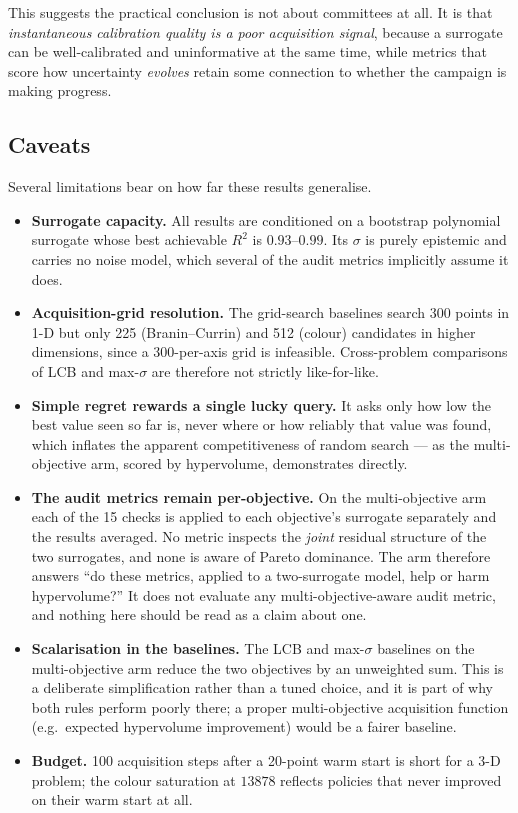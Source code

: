 \documentclass[11pt]{article}
\begin{document}
This suggests the practical conclusion is not about committees at all. It is that \emph{instantaneous calibration quality is a poor acquisition signal}, because a surrogate can be well-calibrated and uninformative at the same time, while metrics that score how uncertainty \emph{evolves} retain some connection to whether the campaign is making progress.

\subsection*{Caveats}

Several limitations bear on how far these results generalise.

\begin{itemize}
\item \textbf{Surrogate capacity.} All results are conditioned on a bootstrap polynomial surrogate whose best achievable $R^2$ is $0.93$--$0.99$. Its $\sigma$ is purely epistemic and carries no noise model, which several of the audit metrics implicitly assume it does.
\item \textbf{Acquisition-grid resolution.} The grid-search baselines search 300 points in 1-D but only 225 (Branin--Currin) and 512 (colour) candidates in higher dimensions, since a 300-per-axis grid is infeasible. Cross-problem comparisons of LCB and max-$\sigma$ are therefore not strictly like-for-like.
\item \textbf{Simple regret rewards a single lucky query.} It asks only how low the best value seen so far is, never where or how reliably that value was found, which inflates the apparent competitiveness of random search --- as the multi-objective arm, scored by hypervolume, demonstrates directly.
\item \textbf{The audit metrics remain per-objective.} On the multi-objective arm each of the 15 checks is applied to each objective's surrogate separately and the results averaged. No metric inspects the \emph{joint} residual structure of the two surrogates, and none is aware of Pareto dominance. The arm therefore answers ``do these metrics, applied to a two-surrogate model, help or harm hypervolume?'' It does not evaluate any multi-objective-aware audit metric, and nothing here should be read as a claim about one.
\item \textbf{Scalarisation in the baselines.} The LCB and max-$\sigma$ baselines on the multi-objective arm reduce the two objectives by an unweighted sum. This is a deliberate simplification rather than a tuned choice, and it is part of why both rules perform poorly there; a proper multi-objective acquisition function (e.g.\ expected hypervolume improvement) would be a fairer baseline.
\item \textbf{Budget.} 100 acquisition steps after a 20-point warm start is short for a 3-D problem; the colour saturation at $13878$ reflects policies that never improved on their warm start at all.
\end{itemize}
\end{document}
